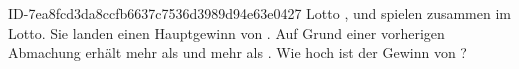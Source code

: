 \begin{exercise}
      {ID-7ea8fcd3da8ccfb6637c7536d3989d94e63e0427}
      {Lotto}
  \ifproblem\problem
    \xxa, \xxb{} und \xxc{} spielen zusammen im Lotto. Sie landen einen Hauptgewinn
    von . Auf Grund einer vorherigen Abmachung erhält \xxb{}
     mehr als \xxa{} und \xxc{}  mehr als \xxb.
    Wie hoch ist der Gewinn von \xxa?
  \fi
\end{exercise}

